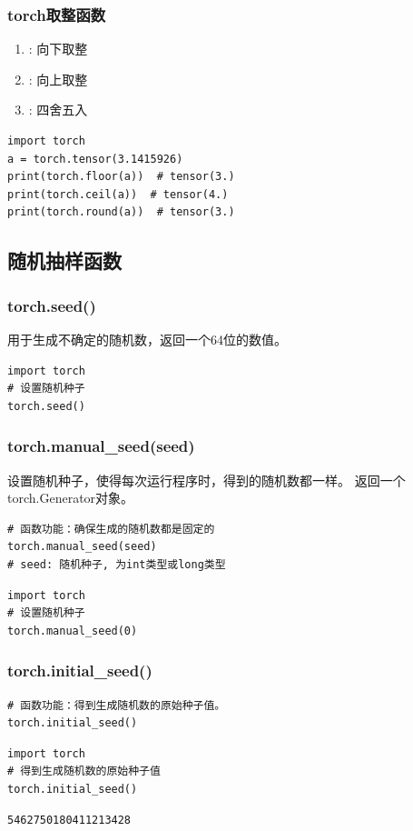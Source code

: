 \subsubsection{torch取整函数}
\begin{enumerate}[label=\arabic*)]
        \item {}: 向下取整
        \item {}: 向上取整
        \item {}: 四舍五入
\end{enumerate}
\begin{lstlisting}[style=pythonstyle]
import torch      
a = torch.tensor(3.1415926)
print(torch.floor(a))  # tensor(3.)
print(torch.ceil(a))  # tensor(4.)
print(torch.round(a))  # tensor(3.)
\end{lstlisting}

\subsection{随机抽样函数}
\subsubsection{torch.seed()}
用于生成不确定的随机数，返回一个64位的数值。

\begin{lstlisting}[style=pythonstyle]
import torch
# 设置随机种子
torch.seed()
\end{lstlisting}

\subsubsection{torch.manual\_seed(seed)}
设置随机种子，使得每次运行程序时，得到的随机数都一样。
返回一个torch.Generator对象。
\begin{lstlisting}[style=demostyle,numbers=none] 
# 函数功能：确保生成的随机数都是固定的   
torch.manual_seed(seed)
# seed: 随机种子, 为int类型或long类型
\end{lstlisting}   
\begin{lstlisting}[style=pythonstyle]
import torch
# 设置随机种子
torch.manual_seed(0)
\end{lstlisting}

\subsubsection{torch.initial\_seed()}
\begin{lstlisting}[style=demostyle,numbers=none] 
# 函数功能：得到生成随机数的原始种子值。
torch.initial_seed()
\end{lstlisting} 
\begin{lstlisting}[style=pythonstyle]
import torch
# 得到生成随机数的原始种子值
torch.initial_seed()
\end{lstlisting}
\begin{lstlisting}[style=demostyle,numbers=none] 
5462750180411213428
\end{lstlisting}        

